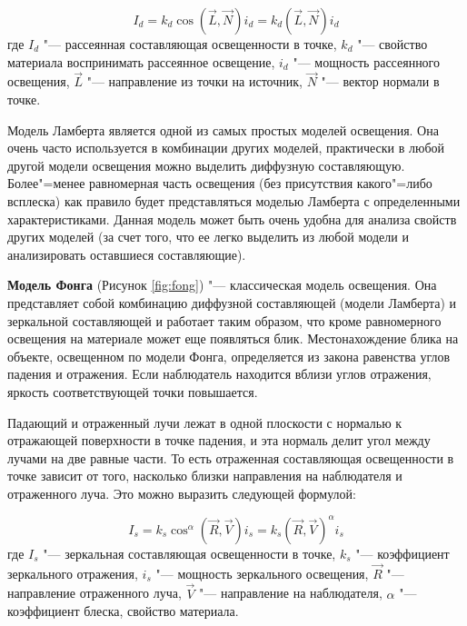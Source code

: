 \begin{equation*}
    I_{d} = k_{d}\cos(\vec{L}, \vec{N})i_{d} = k_{d}(\vec{L}, \vec{N})i_{d}
\end{equation*}
где $I_{d}$ "--- рассеянная составляющая освещенности в точке, $k_{d}$ "--- свойство материала воспринимать рассеянное освещение, $i_{d}$ "--- мощность рассеянного освещения, $\vec{L}$ "--- направление из точки на источник, $\vec{N}$ "--- вектор нормали в точке.

Модель Ламберта является одной из самых простых моделей освещения. Она очень часто используется в комбинации других моделей, практически в любой другой модели освещения можно выделить диффузную составляющую. Более"=менее равномерная часть освещения (без присутствия какого"=либо всплеска) как правило будет представляться моделью Ламберта с определенными характеристиками. Данная модель может быть очень удобна для анализа свойств других моделей (за счет того, что ее легко выделить из любой модели и анализировать оставшиеся составляющие).

\textbf{Модель Фонга} (Рисунок \ref{fig:fong}) "--- классическая модель освещения. Она представляет собой комбинацию диффузной составляющей (модели Ламберта) и зеркальной составляющей и работает таким образом, что кроме равномерного освещения на материале может еще появляться блик. Местонахождение блика на объекте, освещенном по модели Фонга, определяется из закона равенства углов падения и отражения. Если наблюдатель находится вблизи углов отражения, яркость соответствующей точки повышается.

Падающий и отраженный лучи лежат в одной плоскости с нормалью к отражающей поверхности в точке падения, и эта нормаль делит угол между лучами на две равные части. То есть отраженная составляющая освещенности в точке зависит от того, насколько близки направления на наблюдателя и отраженного луча. Это можно выразить следующей формулой\cite{light_models}:

\begin{equation*}
    I_{s} = k_{s}\cos^{\alpha}(\vec{R}, \vec{V})i_{s} = k_{s}(\vec{R}, \vec{V})^{\alpha}i_{s}
\end{equation*}
где $I_{s}$ "--- зеркальная составляющая освещенности в точке, $k_{s}$ "--- коэффициент зеркального отражения, $i_{s}$ "--- мощность зеркального освещения, $\vec{R}$ "--- направление отраженного луча, $\vec{V}$ "--- направление на наблюдателя, $\alpha$ "--- коэффициент блеска, свойство материала.